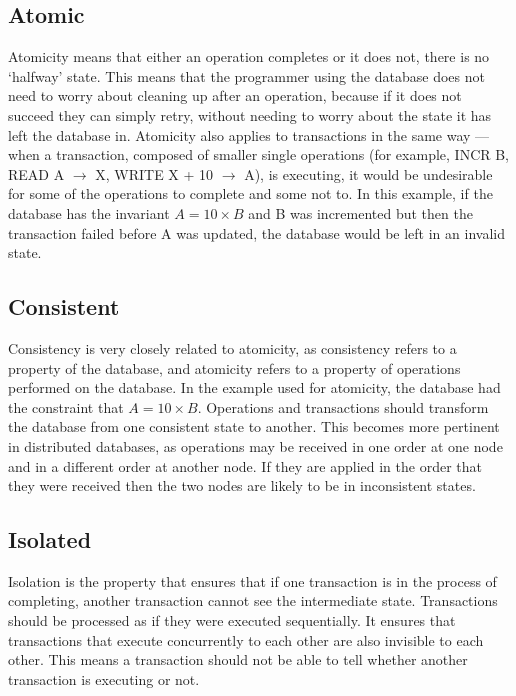 \documentclass[12pt,twoside,notitlepage]{report}
\begin{document}
\subsection*{Atomic}

Atomicity means that either an operation completes or it does not, there is no `halfway' state.
This means that the programmer using the database does not need to worry about cleaning up after
an operation, because if it does not succeed they can simply retry, without needing to worry about
the state it has left the database in. Atomicity also applies to transactions in the same way ---
when a transaction, composed of smaller single operations (for example, INCR
B, READ A $\rightarrow$ X, WRITE X + 10 $\rightarrow$ A), is executing, it would be undesirable
for some of the operations to complete and some not to. In this example, if the database has the
invariant $A = 10\times B$ and B was incremented but then the transaction failed before A was
updated, the database would be left in an invalid state.

\subsection*{Consistent}

Consistency is very closely related to atomicity, as consistency refers to a property of the
database, and atomicity refers to a property of operations performed on the database. In the
example used for atomicity, the database had the constraint that $A = 10\times B$. Operations and
transactions should transform the database from one consistent state to another. This becomes more
pertinent in distributed databases, as operations may be received in one order at one node and in
a different order at another node. If they are applied in the order that they were received then
the two nodes are likely to be in inconsistent states.

\subsection*{Isolated}

Isolation is the property that ensures that if one transaction is in the process of completing,
another transaction cannot see the intermediate state. Transactions should be processed as if they
were executed sequentially. It ensures that transactions that execute concurrently to each other
are also invisible to each other. This means a transaction should not be able to tell whether
another transaction is executing or not.
\end{document}
